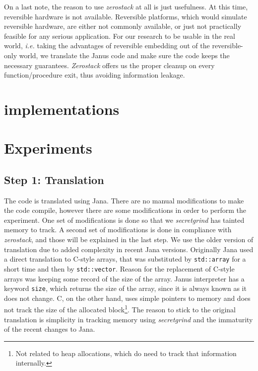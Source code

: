 \documentclass[a4paper,10pt,openright]{memoir}
\newcommand{\ie}{\emph{i.e.}\xspace}
\newcommand{\term}[1]{\textit{#1}}
\newcommand{\code}[1]{\texttt{#1}}
\begin{document}
On a last note, the reason to use \term{zerostack} at all is just 
usefulness. At this time, reversible hardware is not available. 
Reversible platforms, which would simulate reversible hardware, are 
either not commonly available, or just not practically feasible for any 
serious application. For our research to be usable in the real world, 
\ie taking the advantages of reversible embedding out of the 
reversible-only world, we translate the Janus code and make sure the 
code keeps the necessary guarantees. \term{Zerostack} offers us the 
proper cleanup on every function/procedure exit, thus avoiding 
information leakage.

\section{implementations}


\section{Experiments}

\subsection{Step 1: Translation}

The code is translated using Jana. There are no manual modifications to 
make the code compile, however there are some modifications in order to 
perform the experiment. One set of modifications is done so that we 
\term{secretgrind} has tainted memory to track. A second set of 
modifications is done in compliance with \term{zerostack}, and those 
will be explained in the last step. We use the older version of 
translation due to added complexity in recent Jana versions. Originally 
Jana used a direct translation to C-style arrays, that was substituted 
by \code{std::array} for a short time and then by \code{std::vector}. 
Reason for the replacement of C-style arrays was keeping some record of 
the size of the array. Janus interpreter has a keyword \code{size}, 
which returns the size of the array, since it is always known as it 
does not change. C, on the other hand, uses simple pointers to memory 
and does not track the size of the allocated block\footnote{Not related 
to heap allocations, which do need to track that information 
internally.}. The reason to stick to the original translation is 
simplicity in tracking memory using \term{secretgrind} and the 
immaturity of the recent changes to Jana.
\end{document}
